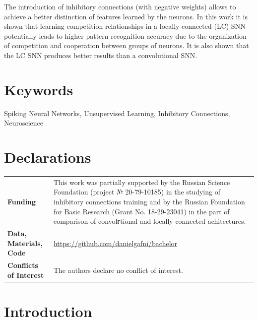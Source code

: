 \documentclass[a4paper,10pt]{article}
\begin{document}
The introduction of inhibitory connections (with negative weights) allows to achieve a better distinction of features learned by the neurons. In this work it is shown that learning competition relationships in a locally connected (LC) SNN potentially leads to higher pattern recognition accuracy due to the organization of competition and cooperation between groups of neurons. It is also shown that the LC SNN produces better results than a convolutional SNN.

\section*{Keywords}
Spiking Neural Networks, Unsupervised Learning, Inhibitory Connections, Neuroscience

\section*{Declarations}

\begin{flushleft}
 \begin{tabularx}{\textwidth}{lm{10cm}}
  \textbf{Funding} & {This work was partially supported by the Russian Science Foundation (project № 20-79-10185) in the studying of inhibitory connections training and by the Russian Foundation for Basic Research (Grant No. 18-29-23041) in the part of comparison of convolгtional and locally connected achitectures.} \\
  \textbf{Data, Materials, Code} & {\href{https://github.com/danielgafni/bachelor}{https://github.com/danielgafni/bachelor}} \\
  \textbf{Conflicts of Interest} & {The authors declare no conflict of interest.} \\
 \end{tabularx}
\end{flushleft}

\pagebreak

\section*{Introduction}
\end{document}

